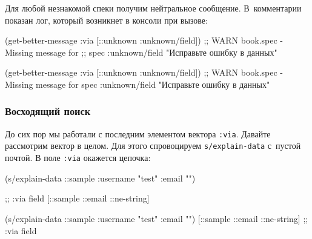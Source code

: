 \fi

\noindent
Для любой незнакомой спеки получим нейтральное сообщение. В~комментарии показан
лог, который возникнет в консоли при вызове:

\ifx\DEVICETYPE\MOBILE

  \begin{clojure}
(get-better-message
    {:via [::unknown :unknown/field]})
;; WARN book.spec - Missing message for
;; spec :unknown/field
"Исправьте ошибку в данных"
  \end{clojure}

\else

  \begin{clojure}
(get-better-message {:via [::unknown :unknown/field]})
;; WARN book.spec - Missing message for spec :unknown/field
"Исправьте ошибку в данных"
  \end{clojure}

\fi

\subsubsection{Восходящий поиск}

До сих пор мы работали с последним элементом вектора \verb|:via|. Давайте
рассмотрим вектор в целом. Для этого спровоцируем \verb|s/explain-data| с~пустой
почтой. В поле \verb|:via| окажется цепочка:

\ifx\DEVICETYPE\MOBILE

\begin{english}
  \begin{clojure}
(s/explain-data ::sample
  {:username "test" :email ""})

;; :via field
[::sample ::email ::ne-string]
  \end{clojure}
\end{english}

\else

\begin{english}
  \begin{clojure}
(s/explain-data ::sample {:username "test" :email ""})
[::sample ::email ::ne-string] ;; :via field
  \end{clojure}
\end{english}

\fi


